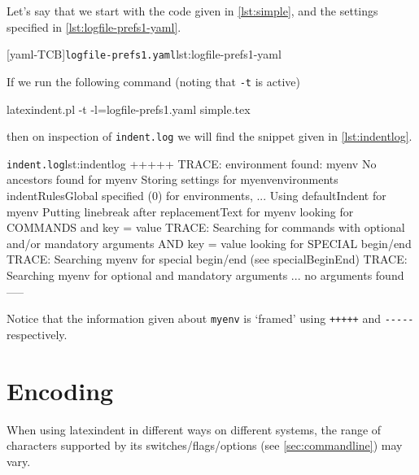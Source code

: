\documentclass[10pt]{article}
\begin{document}
  \begin{example}
  Let's say that we start with the code given in \cref{lst:simple}, and the settings
  specified in \cref{lst:logfile-prefs1-yaml}.

  \begin{minipage}{.35\linewidth}
  \end{minipage}
  \hfill
  \begin{minipage}{.6\linewidth}
   [yaml-TCB]{\texttt{logfile-prefs1.yaml}}{lst:logfile-prefs1-yaml}
  \end{minipage}

  If we run the following command (noting that \texttt{-t} is active)

  \begin{commandshell}
latexindent.pl -t -l=logfile-prefs1.yaml simple.tex
\end{commandshell}

  then on inspection of \texttt{indent.log} we will find the snippet given in
  \cref{lst:indentlog}.
  \begin{cmhlistings}[style=tcblatex,morekeywords={TRACE}]{\texttt{indent.log}}{lst:indentlog}
       +++++
TRACE: environment found: myenv
       No ancestors found for myenv
       Storing settings for myenvenvironments
       indentRulesGlobal specified (0) for environments, ...
       Using defaultIndent for myenv
       Putting linebreak after replacementText for myenv
       looking for COMMANDS and key = {value}
TRACE: Searching for commands with optional and/or mandatory arguments AND key = {value}
       looking for SPECIAL begin/end
TRACE: Searching myenv for special begin/end (see specialBeginEnd)
TRACE: Searching myenv for optional and mandatory arguments
       ... no arguments found
       -----
     \end{cmhlistings}
  Notice that the information given about \texttt{myenv} is `framed' using \texttt{+++++}
  and \lstinline!-----! respectively.
  \end{example}

 \section{Encoding}\label{app:encoding}

  When using latexindent in different ways on different systems, the range of characters
  supported by its switches/flags/options (see \vref{sec:commandline}) may vary.
\end{document}
